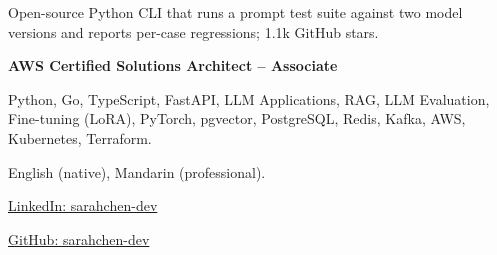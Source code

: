 \begin{resumecolumns}
\begin{highlights}
  \item Open-source Python CLI that runs a prompt test suite against two model
    versions and reports per-case regressions; 1.1k GitHub stars.
\end{highlights}

\textbf{AWS Certified Solutions Architect -- Associate}

%
%

\resumesidebar

Python, Go, TypeScript, FastAPI, LLM Applications, RAG, LLM Evaluation, Fine-tuning (LoRA), PyTorch, pgvector, PostgreSQL, Redis, Kafka, AWS, Kubernetes, Terraform.

English (native), Mandarin (professional).


\href{https://example.com/linkedin}{LinkedIn: sarahchen-dev}\par
\href{https://example.com/github}{GitHub: sarahchen-dev}
\end{resumecolumns}
